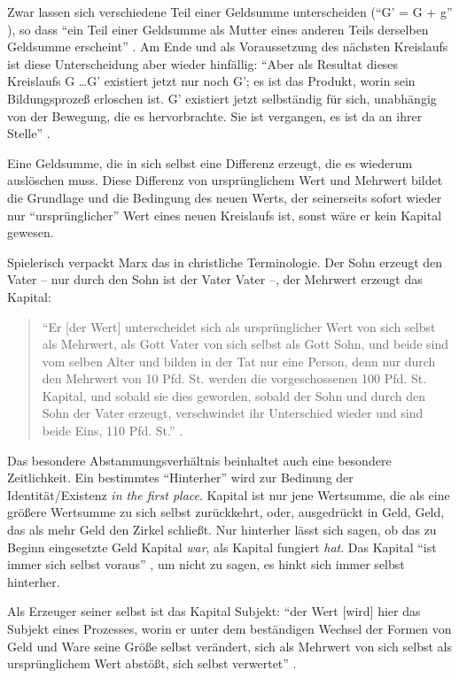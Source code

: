 \documentclass[12pt,
               DIV13,
               paper=a4,
               twoside=false,
               onehalfspacing,
               bibliography=totoc,
               toc=graduated,
               draft,
               ]{scrartcl}
\newcommand{\pc}[2]{\parencite[#1]{#2}}
\begin{document}
Zwar lassen sich verschiedene Teil einer Geldsumme unterscheiden ("`G'
= G + g"' \pc{51}{kap2}), so dass "`ein Teil einer Geldsumme als Mutter
eines anderen Teils derselben Geldsumme erscheint"' \pc{55}{kap2}. Am
Ende und als Voraussetzung des nächsten Kreislaufs ist diese
Unterscheidung aber wieder hinfällig: "`Aber als Resultat dieses
Kreislaufs G \dots G' existiert jetzt nur noch G'; es ist das Produkt,
worin sein Bildungsprozeß erloschen ist. G' existiert jetzt
selbständig für sich, unabhängig von der Bewegung, die es
hervorbrachte. Sie ist vergangen, es ist da an ihrer Stelle"'
\pc{49}{kap2}.

Eine Geldsumme, die in sich selbst eine Differenz erzeugt, die es
wiederum auslöschen muss. Diese Differenz von ursprünglichem Wert und
Mehrwert bildet die Grundlage und die Bedingung des neuen Werts, der
seinerseits sofort wieder nur "`ursprünglicher"' Wert eines neuen
Kreislaufs ist, sonst wäre er kein Kapital gewesen.

Spielerisch verpackt Marx das in christliche Terminologie. Der Sohn
erzeugt den Vater -- nur durch den Sohn ist der Vater Vater --, der
Mehrwert erzeugt das Kapital:
%
\begin{spacing}{1}
\begin{quote}
"`Er [der Wert] unterscheidet sich als ursprünglicher
Wert von sich selbst als Mehrwert, als Gott Vater von sich selbst als
Gott Sohn, und beide sind vom selben Alter und bilden in der Tat nur
eine Person, denn nur durch den Mehrwert von 10 Pfd. St. werden die
vorgeschossenen 100 Pfd. St. Kapital, und sobald sie dies geworden,
sobald der Sohn und durch den Sohn der Vater erzeugt, verschwindet ihr
Unterschied wieder und sind beide Eins, 110 Pfd. St."' \pc{S. 169
f.}{kap}.
\end{quote}
\end{spacing}

Das besondere Abstammungsverhältnis beinhaltet auch eine besondere
Zeitlichkeit. Ein bestimmtes "`Hinterher"' wird zur Bedinung der
Identität/Existenz \emph{in the first place}. Kapital ist nur jene
Wertsumme, die als eine größere Wertsumme zu sich selbst zurückkehrt,
oder, ausgedrückt in Geld, Geld, das als mehr Geld den Zirkel
schließt. Nur hinterher lässt sich sagen, ob das zu Beginn eingesetzte
Geld Kapital \emph{war}, als Kapital fungiert \emph{hat}. Das Kapital
"`ist immer sich selbst voraus"' \pc{125}{strauss}, um nicht zu sagen,
es hinkt sich immer selbst hinterher.

Als Erzeuger seiner selbst ist das Kapital Subjekt: "`der Wert [wird]
hier das Subjekt eines Prozesses, worin er unter dem beständigen
Wechsel der Formen von Geld und Ware seine Größe selbst verändert,
sich als Mehrwert von sich selbst als ursprünglichem Wert abstößt,
sich selbst verwertet"' \pc{169}{kap}.
\end{document}
